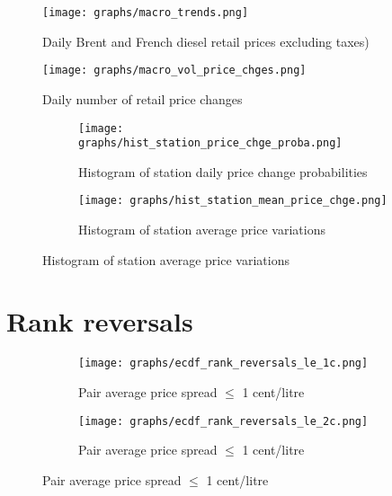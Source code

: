 \documentclass[english]{article}
\begin{document}
{{\begin{figure}[!h]
    \caption{Daily Brent and French diesel retail prices excluding taxes)}
	\centering
		\texttt{[image: graphs/macro\_trends.png]}
\label{fig:macro_trends}
\end{figure}

\begin{figure}[!h]
    \caption{Daily number of retail price changes}
	\centering
		\texttt{[image: graphs/macro\_vol\_price\_chges.png]}
\label{fig:macro_vol_price_chges}
\end{figure}

\begin{figure}[H]
\centering
\caption{Price changes by station)}
\begin{subfigure}{.4\linewidth}
\centering
\texttt{[image: graphs/hist\_station\_price\_chge\_proba.png]}
\caption[short]{Histogram of station daily price change probabilities}
\label{fig:hist_station_price_chge_proba}
\end{subfigure}
\begin{subfigure}{.4\linewidth}
\centering
\texttt{[image: graphs/hist\_station\_mean\_price\_chge.png]}
\caption[short]{Histogram of station average price variations}
\label{fig:hist_station_mean_price_chge}
\end{subfigure}
\end{figure}

\newpage

\section{Rank reversals}

\begin{figure}[H]
\centering
\caption{Empirical distribution functions of rank reversals (raw prices)}
\begin{subfigure}{.4\linewidth}
\centering
\texttt{[image: graphs/ecdf\_rank\_reversals\_le\_1c.png]}
\caption[short]{Pair average price spread $\le$ 1 cent/litre}
\end{subfigure}
\begin{subfigure}{.4\linewidth}
\centering
\texttt{[image: graphs/ecdf\_rank\_reversals\_le\_2c.png]}
\caption[short]{Pair average price spread $\le$ 1 cent/litre}
\end{subfigure}
\end{figure}

}}
\end{document}
